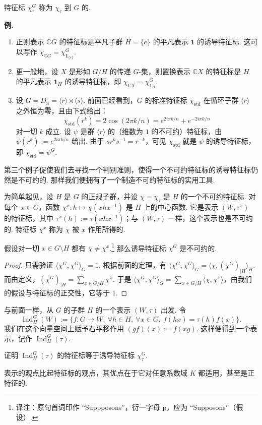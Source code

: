 特征标 $\chi_\tau^G$ 称为 $\chi_\tau$ 到 $G$ 的.

\noindent\textbf{例.}
\begin{enumerate}[label=\roman*)]
\item 正则表示 $\mathbb{C}G$ 的特征标是平凡子群 $H=\{e\}$ 的平凡表示 $\mathbf{1}$ 的诱导特征标. 这可以写作 $\chi_{\mathbb{C}G}=\chi^G_{\mathbf{1}_{\{e\}}}$.
\item 更一般地，设 $X$ 是形如 $G/H$ 的传递 $G$-集，则置换表示 $\mathbb{C}X$ 的特征标是 $H$ 的平凡表示 $\mathbf{1}_H$ 的诱导特征标，即 $\chi_{\mathbb{C}X}=\chi^G_{\mathbf{1}_H}$.
\item 设 $G=D_n=\langle r\rangle\rtimes\langle s\rangle$. 前面已经看到，$G$ 的标准特征标 $\chi_{\mathrm{std}}$ 在循环子群 $\langle r\rangle$ 之外恒为零，且由下式给出：
\[
\chi_{\mathrm{std}}(r^k)=2\cos(2\pi k/n)=e^{2i\pi k/n}+e^{-2i\pi k/n}
\]
对一切 $k$ 成立. 设 $\psi$ 是群 $\langle r\rangle$ 的（维数为 $1$ 的不可约）特征标，由 $\psi(r^k):=e^{2i\pi k/n}$ 给出. 由于 $sr^ks^{-1}=r^{-k}$，可见 $\chi_{\mathrm{std}}$ 就是 $\psi$ 的诱导特征标，即 $\chi_{\mathrm{std}}=\psi^G$.
\end{enumerate}

第三个例子促使我们去寻找一个判别准则，使得一个不可约特征标的诱导特征标仍然是不可约的. 那样我们便拥有了一个制造不可约特征标的实用工具.

为简单起见，设 $H$ 是 $G$ 的正规子群，并设 $\chi=\chi_\tau$ 是 $H$ 的一个不可约特征标. 对每个 $x\in G$，函数 $\chi^x:h\mapsto\chi(xhx^{-1})$ 是 $H$ 上的中心函数. 它是表示 $(W,\tau^x)$ 的特征标，其中 $\tau^x(h):=\tau(xhx^{-1})$；与 $(W,\tau)$ 一样，这个表示也是不可约的. 特征标 $\chi^x$ 称为 $\chi$ 被 $x$ 作用所得的.

\begin{proposition*}
假设对一切 $x\in G\setminus H$ 都有 $\chi\neq\chi^x$.\footnote{译注：原句首词印作 ``Suppposons''，衍一字母 p，应为 ``Supposons''（假设）.} 那么诱导特征标 $\chi^G$ 是不可约的.
\end{proposition*}
\begin{proof}
只需验证 $\langle\chi^G,\chi^G\rangle_G=1$. 根据前面的定理，有 $\langle\chi^G,\chi^G\rangle_G=\langle\chi,(\chi^G)_{|H}\rangle_H$. 而由定义，$(\chi^G)_{|H}=\sum_{x\in G/H}\chi^x$. 于是 $\langle\chi^G,\chi^G\rangle_G=\sum_{x\in G/H}\langle\chi,\chi^x\rangle$，由我们的假设与特征标的正交性，它等于 $1$.
\end{proof}

\begin{numpara}[表示的观点]\label{np:fg-4-3-2}
与前面一样，从 $G$ 的子群 $H$ 的一个表示 $(W,\tau)$ 出发. 令
\[
\operatorname{Ind}_H^G(W):=\{f:G\longrightarrow W,\ \forall h\in H,\ \forall x\in G,\ f(hx)=\tau(h)f(x)\}.
\]
我们在这个向量空间上赋予右平移作用 $(gf)(x):=f(xg)$. 这样便得到一个表示，记作 $\operatorname{Ind}_H^G(\tau)$.
\end{numpara}

\begin{exercise*}
证明 $\operatorname{Ind}_H^G(\tau)$ 的特征标等于诱导特征标 $\chi_\tau^G$.
\end{exercise*}

表示的观点比起特征标的观点，其优点在于它对任意系数域 $K$ 都适用，甚至是正特征的.

